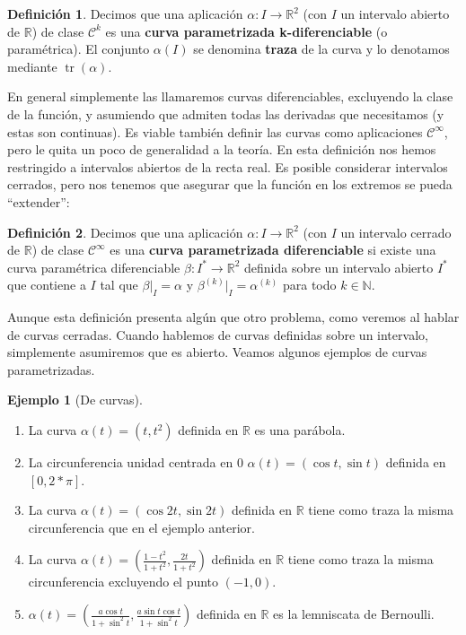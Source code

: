 \documentclass{article}
\theoremstyle{definition}
\newtheorem{define}{Definición}
\newtheorem{ejem}{Ejemplo}
\DeclareMathOperator{\trace}{tr}
\newcommand{\reales}{\mathbb{R}}
\newcommand{\naturales}{\mathbb{N}}
\newcommand{\cinfinito}{\mathcal{C}^{\infty}}
\newcommand{\claseck}[1]{\mathcal{C}^{#1}}
\begin{document}
\begin{define}
	Decimos que una aplicación $\alpha: I \rightarrow \reales^2$ (con $I$ un intervalo abierto de $\reales$) de clase $\claseck{k}$ es una \textbf{curva parametrizada k-diferenciable} (o paramétrica). El conjunto $\alpha(I)$ se denomina \textbf{traza} de la curva y lo denotamos mediante $\trace(\alpha)$.
\end{define}
En general simplemente las llamaremos curvas diferenciables, excluyendo la clase de la función, y asumiendo que admiten todas las derivadas que necesitamos (y estas son continuas). Es viable también definir las curvas como aplicaciones $\cinfinito$, pero le quita un poco de generalidad a la teoría. En esta definición nos hemos restringido a intervalos abiertos de la recta real. Es posible considerar intervalos cerrados, pero nos tenemos que asegurar que la función en los extremos se pueda ``extender'':
\begin{define}
	Decimos que una aplicación $\alpha: I \rightarrow \reales^2$ (con $I$ un intervalo cerrado de $\reales$) de clase $\cinfinito$ es una \textbf{curva parametrizada diferenciable} si existe una curva paramétrica diferenciable $\beta: I^* \rightarrow \reales^2$ definida sobre un intervalo abierto $I^*$ que contiene a $I$ tal que $\beta  \big|_I = \alpha$ y $\beta^{(k)}  \big|_I = \alpha^{(k)}$ para todo $k \in \naturales$.
\end{define}
Aunque esta definición presenta algún que otro problema, como veremos al hablar de curvas cerradas. Cuando hablemos de curvas definidas sobre un intervalo, simplemente asumiremos que es abierto.
Veamos algunos ejemplos de curvas parametrizadas.
\begin{ejem}[De curvas]
\begin{enumerate}
	\item
	La curva $\alpha (t) = (t, t^2)$ definida en $\reales$ es una parábola. \\ 
	\item 
	La circunferencia unidad centrada en $0$ $\alpha(t) = (\cos t, \sin t)$ definida en $[0, 2*\pi]$. \\ 
	\item
	La curva $\alpha(t) = (\cos 2t, \sin 2t)$ definida en $\reales$ tiene como traza la misma circunferencia que en el ejemplo anterior.
	\item
	La curva $\alpha(t) = (\frac{1-t^2}{1+t^2}, \frac{2t}{1+t^2})$ definida en $\reales$ tiene como traza la misma circunferencia excluyendo el punto $(-1, 0)$.
	\item
	$\alpha(t) = (\frac{a\cos t}{1 + \sin^2 t}, \frac{a\sin t \cos t}{1 + \sin^2 t})$ definida en $\reales$ es la lemniscata de Bernoulli.
\end{enumerate}
\end{ejem}
\end{document}
